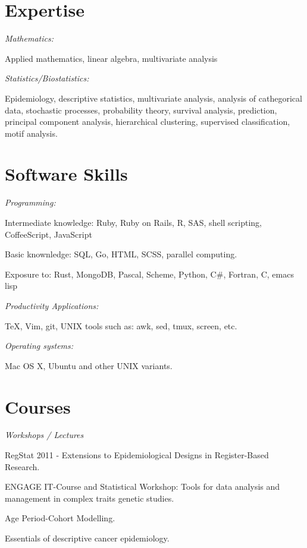 %
%
\section{Expertise}
\textit{Mathematics:}
\begin{innerlist}
    \item Applied mathematics, linear algebra, multivariate analysis
\end{innerlist}

\halfblankline

\textit{Statistics/Biostatistics:}
\begin{innerlist}
    \item Epidemiology, descriptive statistics, multivariate analysis, analysis of cathegorical data, stochastic processes, probability theory, survival analysis, prediction, principal component analysis, hierarchical clustering, supervised classification, motif analysis.
\end{innerlist}

%
%
\section{Software Skills}
\textit{Programming:}
\begin{innerlist}
    \item Intermediate knowledge: Ruby, Ruby on Rails, R, SAS, shell scripting, CoffeeScript, JavaScript
    \item Basic knownledge: SQL, Go, HTML, SCSS, parallel computing.
    \item Exposure to: Rust, MongoDB, Pascal, Scheme, Python, C\#, Fortran, C, emacs lisp
\end{innerlist}

\halfblankline

\textit{Productivity Applications:}
\begin{innerlist}
\item \TeX{}, Vim, git, UNIX tools such as: awk, sed, tmux, screen, etc.
\end{innerlist}

\halfblankline

\textit{Operating systems:}
\begin{innerlist}
    \item Mac OS X, Ubuntu and other UNIX variants.
\end{innerlist}


%
%
\section{Courses}
\textit{Workshops / Lectures}
\begin{innerlist}
    \item RegStat 2011 - Extensions to Epidemiological Designs in Register-Based Research.
    \item ENGAGE IT-Course and Statistical Workshop: Tools for data analysis and management in complex traits genetic studies.
    \item Age Period-Cohort Modelling.
    \item Essentials of descriptive cancer epidemiology.
\end{innerlist}

